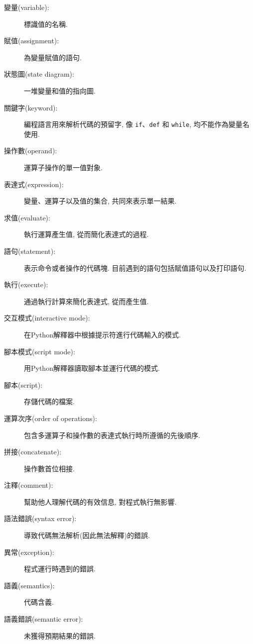 \documentclass[10pt]{book}
\begin{document}
\begin{description}

\item[變量(variable):]  標識值的名稱. 

\item[賦值(assignment):]  為變量賦值的語句. 

\item[狀態圖(state diagram):]  一堆變量和值的指向圖. 

\item[關鍵字(keyword):]  編程語言用來解析代碼的預留字, 像 {\tt if}、{\tt  def} 和 {\tt while}, 
均不能作為變量名使用. 

\item[操作數(operand):]  運算子操作的單一值對象. 

\item[表達式(expression):]  變量、運算子以及值的集合, 共同來表示單一結果. 

\item[求值(evaluate):]  執行運算產生值, 從而簡化表達式的過程. 

\item[語句(statement):]  表示命令或者操作的代碼塊. 目前遇到的語句包括賦值語句以及打印語句. 

\item[執行(execute):]  通過執行計算來簡化表達式, 從而產生值.

\item[交互模式(interactive mode):] 在Python解釋器中根據提示符進行代碼輸入的模式. 

\item[腳本模式(script mode):] 用Python解釋器讀取腳本並運行代碼的模式. 

\item[腳本(script):] 存儲代碼的檔案. 

\item[運算次序(order of operations):]  包含多運算子和操作數的表達式執行時所遵循的先後順序. 

\item[拼接(concatenate):]  操作數首位相接. 

\item[注釋(comment):]  幫助他人理解代碼的有效信息, 對程式執行無影響. 

\item[語法錯誤(syntax error):] 導致代碼無法解析(因此無法解釋)的錯誤. 

\item[異常(exception):]  程式運行時遇到的錯誤. 

\item[語義(semantics):]  代碼含義. 

\item[語義錯誤(semantic error):]   未獲得預期結果的錯誤. 

\end{description}
\end{document}

